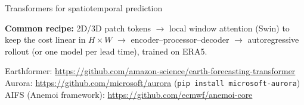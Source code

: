 \documentclass{beamer}
\begin{document}
\begin{frame}{Transformers for spatiotemporal prediction}
    \vspace{0.2cm}
    \raggedright
    \footnotesize
    \textbf{Common recipe:} 2D/3D patch tokens $\rightarrow$ local window attention (Swin) to keep the cost linear in $H \times W$ $\rightarrow$ encoder--processor--decoder $\rightarrow$ autoregressive rollout (or one model per lead time), trained on ERA5.

    \vfill
    {\tiny
    Earthformer: \url{https://github.com/amazon-science/earth-forecasting-transformer}\\
    Aurora: \url{https://github.com/microsoft/aurora} (\texttt{pip install microsoft-aurora})\\
    AIFS (Anemoi framework): \url{https://github.com/ecmwf/anemoi-core}\par}
\end{frame}
\end{document}
